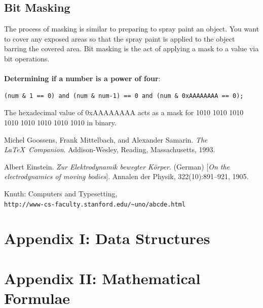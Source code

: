 \documentclass[]{book}
\renewcommand\cftchapafterpnum{\vskip 10pt}
\begin{document}
    \section{Bit Masking}
    The process of masking is similar to preparing to spray paint an object. You want to cover any exposed areas
    so that the spray paint is applied to the object barring the covered area. Bit masking is the act of applying
    a mask to a value via bit operations. \\\\
    \textbf{Determining if a number is a power of four}:
    \begin{verbatim}
(num & 1 == 0) and (num & num-1) == 0 and (num & 0xAAAAAAAA == 0);
    \end{verbatim}
    The hexadecimal value of 0xAAAAAAAA acts as a mask for 1010 1010 1010 1010 1010 1010 1010 1010 in binary.

  \backmatter
  \setlength{\cftbeforechapskip}{15pt}
  \renewcommand\cftchapafterpnum{\vskip 10pt}
  \renewcommand\bibname{\large{References}}
  \begin{thebibliography}{9}
  Michel Goossens, Frank Mittelbach, and Alexander Samarin.
  \textit{The \LaTeX\ Companion}.
  Addison-Wesley, Reading, Massachusetts, 1993.

  Albert Einstein.
  \textit{Zur Elektrodynamik bewegter K{\"o}rper}. (German)
  [\textit{On the electrodynamics of moving bodies}].
  Annalen der Physik, 322(10):891–921, 1905.

  Knuth: Computers and Typesetting,
  \\\texttt{http://www-cs-faculty.stanford.edu/\~{}uno/abcde.html}
  \end{thebibliography}


  \appendix
  \chapter{\large{Appendix I: \textnormal{Data Structures}}}
  \chapter{\large{Appendix II: \textnormal{Mathematical Formulae}}}
  \printindex
\end{document}
